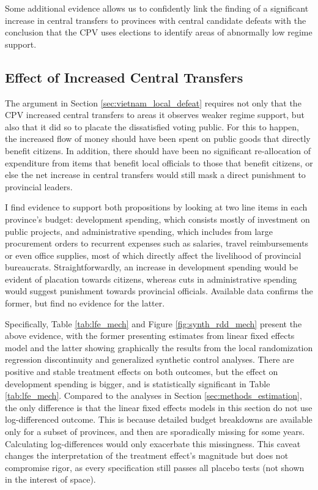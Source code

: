 \documentclass[12pt]{article}
\newcommand{\1}{\mathbbm{1}}
\begin{document}
Some additional evidence allows us to confidently link the finding of a significant increase in central transfers to provinces with central candidate defeats with the conclusion that the CPV uses elections to identify areas of abnormally low regime support.

\subsection{Effect of Increased Central Transfers}

The argument in Section \ref{sec:vietnam_local_defeat} requires not only that the CPV increased central transfers to areas it observes weaker regime support, but also that it did so to placate the dissatisfied voting public. For this to happen, the increased flow of money should have been spent on public goods that directly benefit citizens. In addition, there should have been no significant re-allocation of expenditure from items that benefit local officials to those that benefit citizens, or else the net increase in central transfers would still mask a direct punishment to provincial leaders. 

I find evidence to support both propositions by looking at two line items in each province's budget: development spending, which consists mostly of investment on public projects, and administrative spending, which includes from large procurement orders to recurrent expenses such as salaries, travel reimbursements or even office supplies, most of which directly affect the livelihood of provincial bureaucrats. Straightforwardly, an increase in development spending would be evident of placation towards citizens, whereas cuts in administrative spending would suggest punishment towards provincial officials. Available data confirms the former, but find no evidence for the latter.



Specifically, Table \ref{tab:lfe_mech} and Figure \ref{fig:synth_rdd_mech} present the above evidence, with the former presenting estimates from linear fixed effects model and the latter showing graphically the results from the local randomization regression discontinuity and generalized synthetic control analyses. There are positive and stable treatment effects on both outcomes, but the effect on development spending is bigger, and is statistically significant in Table \ref{tab:lfe_mech}. Compared to the analyses in Section \ref{sec:methods_estimation}, the only difference is that the linear fixed effects models in this section do not use log-differenced outcome. This is because detailed budget breakdowns are available only for a subset of provinces, and then are sporadically missing for some years. Calculating log-differences would only exacerbate this missingness. This caveat changes the interpretation of the treatment effect's magnitude but does not compromise rigor, as every specification still passes all placebo tests (not shown in the interest of space).
\end{document}
